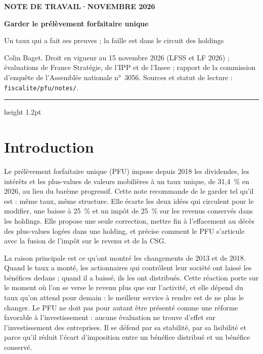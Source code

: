 \documentclass[11pt,a4paper]{article}
\begin{document}
\renewcommand{\figurename}{Figure}\renewcommand{\tablename}{Tableau}

\thispagestyle{empty}
\vspace*{0.6cm}
{\footnotesize\color{ocre}\bfseries NOTE DE TRAVAIL\quad·\quad NOVEMBRE 2026\par}
\vspace{8pt}
{\fontsize{22}{26}\selectfont\bfseries\color{bleu}Garder le prélèvement forfaitaire unique\par}
\vspace{6pt}
{\large Un taux qui a fait ses preuves ; la faille est dans le circuit des holdings\par}
\vspace{8pt}
{\small Colin Baget. Droit en vigueur au 15 novembre 2026 (LFSS et LF 2026) ; évaluations de France
Stratégie, de l'IPP et de l'Insee ; rapport de la commission d'enquête de l'Assemblée nationale n°~3056.
Sources et statut de lecture : \texttt{fiscalite/pfu/notes/}.\par}
\vspace{6pt}
{\color{bleu}\hrule height 1.2pt}
\vspace{4pt}

\section*{Introduction}

Le prélèvement forfaitaire unique (PFU) impose depuis 2018 les dividendes, les intérêts et les plus-values
de valeurs mobilières à un taux unique, de 31,4~\% en 2026, au lieu du barème progressif. Cette note
recommande de le garder tel qu'il est : même taux, même structure. Elle écarte les deux idées qui
circulent pour le modifier, une baisse à 25~\% et un impôt de 25~\% sur les revenus conservés dans les
holdings. Elle propose une seule correction, mettre fin à l'effacement au décès des plus-values logées dans
une holding, et précise comment le PFU s'articule avec la fusion de l'impôt sur le revenu et de la CSG.

La raison principale est ce qu'ont montré les changements de 2013 et de 2018. Quand le taux a monté, les
actionnaires qui contrôlent leur société ont laissé les bénéfices dedans ; quand il a baissé, ils les ont
distribués. Cette réaction porte sur le moment où l'on se verse le revenu plus que sur l'activité, et elle
dépend du taux qu'on attend pour demain : le meilleur service à rendre est de ne plus le changer. Le PFU ne doit pas pour autant être présenté comme une réforme favorable à l'investissement : aucune
évaluation ne trouve d'effet sur l'investissement des entreprises. Il se défend par sa stabilité, par sa
lisibilité et parce qu'il réduit l'écart d'imposition entre un bénéfice distribué et un bénéfice conservé.
\end{document}
